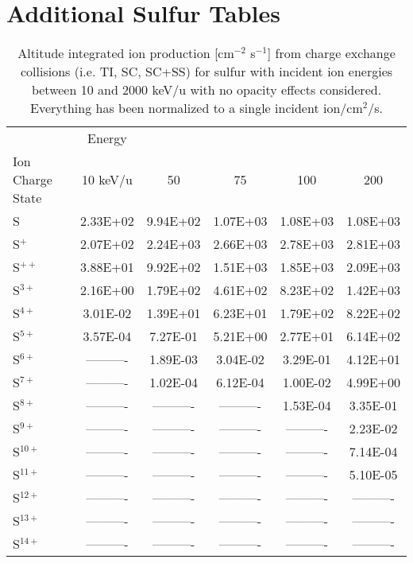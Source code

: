 \section{Additional Sulfur Tables}
\label{app:Sul}

\begin{table}[ht]
    \centering
    \caption{Altitude integrated ion production [cm$^{-2}$ s$^{-1}$] from charge exchange collisions (i.e. TI, SC, SC+SS) for sulfur with incident ion energies between 10 and 2000 keV/u with no opacity effects considered. Everything has been normalized to a single incident ion/cm$^2$/s.}
    \begin{tabular}{l|c|c|c|c|c}
    \hline
    & Energy & & & & \\
    Ion Charge State & 10 keV/u & 50 & 75 & 100 & 200 \\
    \hline
    S         & 2.33E+02 & 9.94E+02 & 1.07E+03 & 1.08E+03 & 1.08E+03 \\
    S$^+$     & 2.07E+02 & 2.24E+03 & 2.66E+03 & 2.78E+03 & 2.81E+03 \\
    S$^{ ++}$ & 3.88E+01 & 9.92E+02 & 1.51E+03 & 1.85E+03 & 2.09E+03 \\
    S$^{ 3+}$ & 2.16E+00 & 1.79E+02 & 4.61E+02 & 8.23E+02 & 1.42E+03 \\
    S$^{ 4+}$ & 3.01E-02 & 1.39E+01 & 6.23E+01 & 1.79E+02 & 8.22E+02 \\
    S$^{ 5+}$ & 3.57E-04 & 7.27E-01 & 5.21E+00 & 2.77E+01 & 6.14E+02 \\
    S$^{ 6+}$ & ---------- & 1.89E-03 & 3.04E-02 & 3.29E-01 & 4.12E+01 \\
    S$^{ 7+}$ & ---------- & 1.02E-04 & 6.12E-04 & 1.00E-02 & 4.99E+00 \\
    S$^{ 8+}$ & ---------- & ---------- & ---------- & 1.53E-04 & 3.35E-01 \\
    S$^{ 9+}$ & ---------- & ---------- & ---------- & ---------- & 2.23E-02 \\
    S$^{10+}$ & ---------- & ---------- & ---------- & ---------- & 7.14E-04 \\
    S$^{11+}$ & ---------- & ---------- & ---------- & ---------- & 5.10E-05 \\
    S$^{12+}$ & ---------- & ---------- & ---------- & ---------- & ---------- \\
    S$^{13+}$ & ---------- & ---------- & ---------- & ---------- & ---------- \\
    S$^{14+}$ & ---------- & ---------- & ---------- & ---------- & ---------- \\

\end{tabular}
\end{table}
